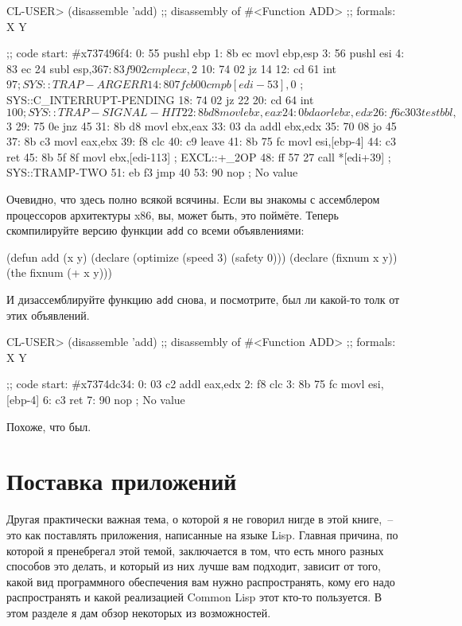 \begin{myverb}
CL-USER> (disassemble 'add)
;; disassembly of #<Function ADD>
;; formals: X Y

;; code start: #x737496f4:
   0: 55         pushl	ebp
   1: 8b ec    movl	ebp,esp
   3: 56         pushl	esi
   4: 83 ec 24 subl	esp,$36
   7: 83 f9 02 cmpl	ecx,$2
  10: 74 02    jz	14
  12: cd 61    int	$97   ; SYS::TRAP-ARGERR
  14: 80 7f cb 00 cmpb	[edi-53],$0        ; SYS::C_INTERRUPT-PENDING
  18: 74 02    jz	22
  20: cd 64    int	$100  ; SYS::TRAP-SIGNAL-HIT
  22: 8b d8    movl	ebx,eax
  24: 0b da    orl	ebx,edx
  26: f6 c3 03 testb	bl,$3
  29: 75 0e    jnz	45
  31: 8b d8    movl	ebx,eax
  33: 03 da    addl	ebx,edx
  35: 70 08    jo	45
  37: 8b c3    movl	eax,ebx
  39: f8         clc
  40: c9         leave
  41: 8b 75 fc movl	esi,[ebp-4]
  44: c3         ret
  45: 8b 5f 8f movl	ebx,[edi-113]    ; EXCL::+_2OP
  48: ff 57 27 call	*[edi+39]   ; SYS::TRAMP-TWO
  51: eb f3    jmp	40
  53: 90         nop
; No value
\end{myverb}

Очевидно, что здесь полно всякой всячины. Если вы знакомы с ассемблером процессоров
архитектуры x86, вы, может быть, это поймёте. Теперь скомпилируйте версию функции \lstinline{add}
со всеми объявлениями:

\begin{myverb}
(defun add (x y)
  (declare (optimize (speed 3) (safety 0)))
  (declare (fixnum x y))
  (the fixnum (+ x y)))
\end{myverb}

И дизассемблируйте функцию \lstinline{add} снова, и посмотрите, был ли какой-то толк от
этих объявлений.

\begin{myverb}
CL-USER> (disassemble 'add)
;; disassembly of #<Function ADD>
;; formals: X Y

;; code start: #x7374dc34:
   0: 03 c2    addl	eax,edx
   2: f8         clc
   3: 8b 75 fc movl	esi,[ebp-4]
   6: c3         ret
   7: 90         nop
; No value
\end{myverb}

Похоже, что был.

\section{Поставка приложений}

Другая практически важная тема, о которой я не говорил нигде в этой книге,~-- это как
поставлять приложения, написанные на языке Lisp. Главная причина, по которой я пренебрегал
этой темой, заключается в том, что есть много разных способов это делать, и который из них
лучше вам подходит, зависит от того, какой вид программного обеспечения вам нужно
распространять, кому его надо распространять и какой реализацией Common Lisp этот кто-то
пользуется. В этом разделе я дам обзор некоторых из возможностей.

